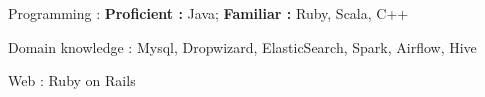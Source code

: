 


\begin{cvskills}


\cvskill
	{Programming : } 
	{\textbf{Proficient :}  Java;
	\textbf{Familiar :} Ruby, Scala, C++} 


\cvskill
	{Domain knowledge : }
	{Mysql, Dropwizard, ElasticSearch, Spark, Airflow, Hive}



\cvskill
{Web : } %
{Ruby on Rails}

\end{cvskills}

